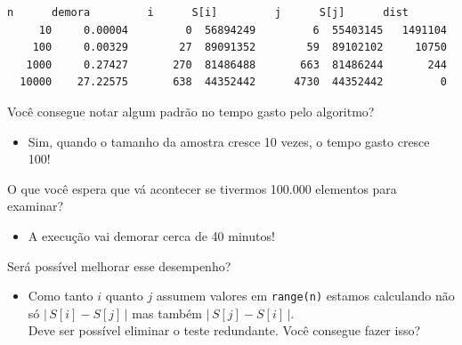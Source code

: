 \documentclass[11pt,a4paper]{article}
\providecommand{\tightlist}{%
      \setlength{\itemsep}{0pt}\setlength{\parskip}{0pt}}
\begin{document}
    \begin{Verbatim}[commandchars=\\\{\}]
      n      demora         i      S[i]         j      S[j]      dist
     10     0.00004         0  56894249         6  55403145   1491104
    100     0.00329        27  89091352        59  89102102     10750
   1000     0.27427       270  81486488       663  81486244       244
  10000    27.22575       638  44352442      4730  44352442         0

    \end{Verbatim}

    Você consegue notar algum padrão no tempo gasto pelo algoritmo?

    \begin{itemize}
\tightlist
\item
  Sim, quando o tamanho da amostra cresce 10 vezes, o tempo gasto cresce
  100!
\end{itemize}

    O que você espera que vá acontecer se tivermos 100.000 elementos para
examinar?

    \begin{itemize}
\tightlist
\item
  A execução vai demorar cerca de 40 minutos!
\end{itemize}

    Será possível melhorar esse desempenho?

\begin{itemize}
\tightlist
\item
  Como tanto \(i\) quanto \(j\) assumem valores em \texttt{range(n)}
  estamos calculando não só \(\lvert\, S[i] - S[j] \,\rvert\) mas também
  \(\lvert\, S[j] - S[i] \,\rvert\).\\
  Deve ser possível eliminar o teste redundante. Você consegue fazer
  isso?
\end{itemize}
\end{document}
